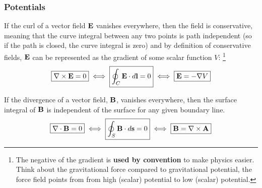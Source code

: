     \subsubsection*{Potentials}
        If the curl of a vector field $\vb{E}$ vanishes everywhere, then the field is conservative, meaning that the curve integral between any two points is path independent (so if the path is closed, the curve integral is zero) and by definition of conservative fields, $\vb{E}$ can be represented as the gradient of some scalar function $V$:
        \footnote{The negative of the gradient is \textbf{used by convention} to make physics easier. Think about the gravitational force compared to gravitational potential, the force field points from from high (scalar) potential to low (scalar) potential.}
        \begin{align*}
            \boxed{\nabla \times \vb{E} = 0} 
            \iff
            \boxed{\oint_C \vb{E}\cdot d\vb{l}=0} 
            \iff
            \boxed{\vb{E} = -\nabla V}
        \end{align*}

        If the divergence of a vector field, $\vb{B}$, vanishes everywhere, then the surface integral of $\vb{B}$ is independent of the surface for any given boundary line. 
        \begin{align*}
            \boxed{\nabla \cdot \vb{B} = 0} 
            \iff
            \boxed{\oint_S\vb{B}\cdot d\vb{s}=0}
            \iff
            \boxed{\vb{B} = \nabla \times \vb{A}}
        \end{align*}
%